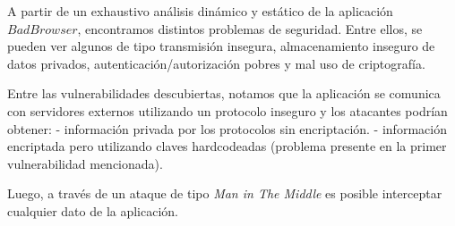 \documentclass[10pt, a4paper]{article}
\begin{document}
A partir de un exhaustivo análisis dinámico y estático de la aplicación $BadBrowser$, encontramos distintos problemas de seguridad. Entre ellos, se pueden ver algunos de tipo transmisión insegura, almacenamiento inseguro de datos privados, autenticación/autorización pobres y mal uso de criptografía. 

Entre las vulnerabilidades descubiertas, notamos que la aplicación se comunica con servidores externos utilizando un protocolo inseguro y los atacantes podrían obtener:
 - información privada por los protocolos sin encriptación.
 - información encriptada pero utilizando claves hardcodeadas (problema presente en la primer vulnerabilidad mencionada).
 
 Luego, a través de un ataque de tipo \textit{Man in The Middle} es posible interceptar cualquier dato de la aplicación.
\end{document}

